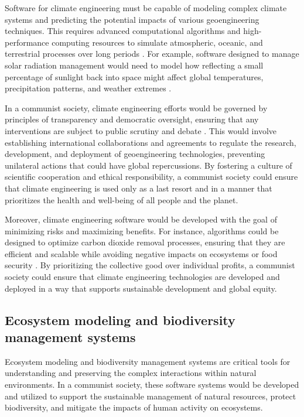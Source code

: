 Software for climate engineering must be capable of modeling complex climate systems and predicting the potential impacts of various geoengineering techniques. This requires advanced computational algorithms and high-performance computing resources to simulate atmospheric, oceanic, and terrestrial processes over long periods \cite[pp.~55-63]{crutzen2006geoengineering}. For example, software designed to manage solar radiation management would need to model how reflecting a small percentage of sunlight back into space might affect global temperatures, precipitation patterns, and weather extremes \cite[pp.~180-188]{keith2013climate}.

In a communist society, climate engineering efforts would be governed by principles of transparency and democratic oversight, ensuring that any interventions are subject to public scrutiny and debate \cite[pp.~245-252]{shepherd2009geoengineering}. This would involve establishing international collaborations and agreements to regulate the research, development, and deployment of geoengineering technologies, preventing unilateral actions that could have global repercussions. By fostering a culture of scientific cooperation and ethical responsibility, a communist society could ensure that climate engineering is used only as a last resort and in a manner that prioritizes the health and well-being of all people and the planet.

Moreover, climate engineering software would be developed with the goal of minimizing risks and maximizing benefits. For instance, algorithms could be designed to optimize carbon dioxide removal processes, ensuring that they are efficient and scalable while avoiding negative impacts on ecosystems or food security \cite[pp.~134-142]{macmartin2016solar}. By prioritizing the collective good over individual profits, a communist society could ensure that climate engineering technologies are developed and deployed in a way that supports sustainable development and global equity.

\subsection{Ecosystem modeling and biodiversity management systems}

Ecosystem modeling and biodiversity management systems are critical tools for understanding and preserving the complex interactions within natural environments. In a communist society, these software systems would be developed and utilized to support the sustainable management of natural resources, protect biodiversity, and mitigate the impacts of human activity on ecosystems.

